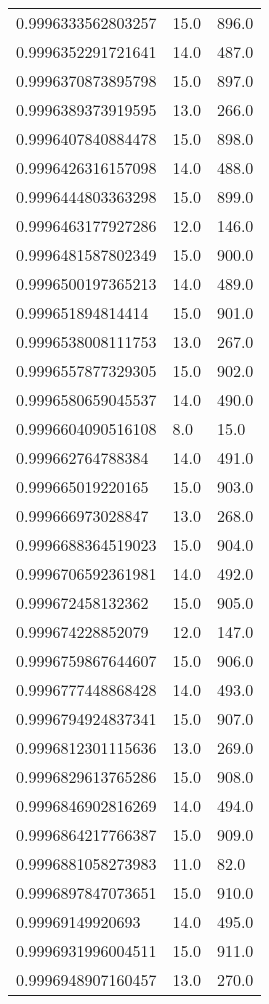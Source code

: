 \begin{center}
\begin{supertabular}[H]{p{0.30\textwidth}p{0.05\textwidth}p{0.05\textwidth}}
0.9996333562803257 & 15.0 & 896.0 \\ 
0.9996352291721641 & 14.0 & 487.0 \\ 
0.9996370873895798 & 15.0 & 897.0 \\ 
0.9996389373919595 & 13.0 & 266.0 \\ 
0.9996407840884478 & 15.0 & 898.0 \\ 
0.9996426316157098 & 14.0 & 488.0 \\ 
0.9996444803363298 & 15.0 & 899.0 \\ 
0.9996463177927286 & 12.0 & 146.0 \\ 
0.9996481587802349 & 15.0 & 900.0 \\ 
0.9996500197365213 & 14.0 & 489.0 \\ 
0.999651894814414 & 15.0 & 901.0 \\ 
0.9996538008111753 & 13.0 & 267.0 \\ 
0.9996557877329305 & 15.0 & 902.0 \\ 
0.9996580659045537 & 14.0 & 490.0 \\ 
0.9996604090516108 & 8.0 & 15.0 \\ 
0.999662764788384 & 14.0 & 491.0 \\ 
0.999665019220165 & 15.0 & 903.0 \\ 
0.999666973028847 & 13.0 & 268.0 \\ 
0.9996688364519023 & 15.0 & 904.0 \\ 
0.9996706592361981 & 14.0 & 492.0 \\ 
0.999672458132362 & 15.0 & 905.0 \\ 
0.999674228852079 & 12.0 & 147.0 \\ 
0.9996759867644607 & 15.0 & 906.0 \\ 
0.9996777448868428 & 14.0 & 493.0 \\ 
0.9996794924837341 & 15.0 & 907.0 \\ 
0.9996812301115636 & 13.0 & 269.0 \\ 
0.9996829613765286 & 15.0 & 908.0 \\ 
0.9996846902816269 & 14.0 & 494.0 \\ 
0.9996864217766387 & 15.0 & 909.0 \\ 
0.9996881058273983 & 11.0 & 82.0 \\ 
0.9996897847073651 & 15.0 & 910.0 \\ 
0.99969149920693 & 14.0 & 495.0 \\ 
0.9996931996004511 & 15.0 & 911.0 \\ 
0.9996948907160457 & 13.0 & 270.0 \\ 

\end{supertabular}
\end{center}
